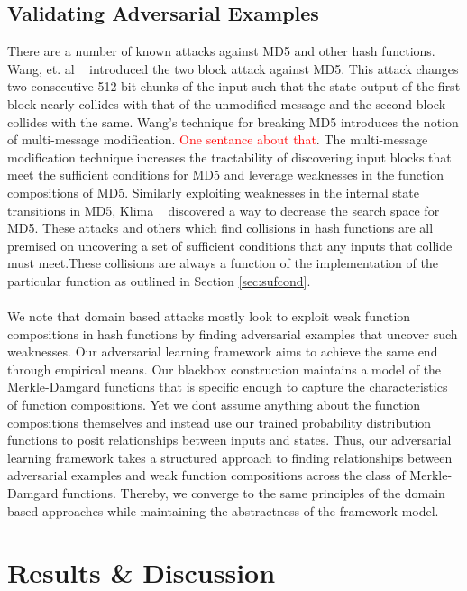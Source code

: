 \documentclass[letterpaper,twocolumn,10pt]{article}
\begin{document}
\subsection{Validating Adversarial Examples}
There are a number of known attacks against MD5 and other hash functions. Wang, et. al ~\cite{wang2005break} introduced the two block attack against MD5. This attack changes two consecutive 512 bit chunks of the input such that the state output of the first block nearly collides with that of the unmodified message and the second block collides with the same. Wang's technique for breaking MD5 introduces the notion of multi-message modification. \textcolor{red}{One sentance about that}. The multi-message modification technique increases the tractability of discovering input blocks that meet the sufficient conditions for MD5 and leverage weaknesses in the function compositions of MD5. Similarly exploiting weaknesses in the internal state transitions in MD5, Klima ~\cite{klima2005finding} discovered a way to decrease the search space for MD5. These attacks and others which find collisions in hash functions are all premised on uncovering a set of sufficient conditions that any inputs that collide must meet.These collisions are always a function of the implementation of the particular function as outlined in Section \ref{sec:sufcond}.
\\
\\
We note that domain based attacks mostly look to exploit weak function compositions in hash functions by finding adversarial examples that uncover such weaknesses. Our adversarial learning framework aims to achieve the same end through empirical means. Our blackbox construction maintains a model of the Merkle-Damgard functions that is specific enough to capture the characteristics of function compositions. Yet we dont assume anything about the function compositions themselves and instead use our trained probability distribution functions to posit relationships between inputs and states. Thus, our adversarial learning framework takes a structured approach to finding relationships between adversarial examples and weak function compositions across the class of Merkle-Damgard functions. Thereby, we converge to the same principles of the domain based approaches while maintaining the abstractness of the framework model. 


\section{Results \& Discussion}
\end{document}

